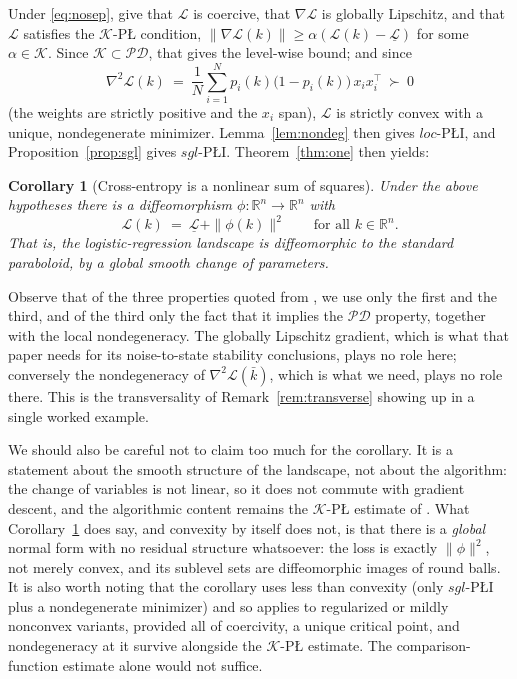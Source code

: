 \documentclass[11pt]{article}
\theoremstyle{plain}
\newtheorem{cor}[thm]{Corollary}
\theoremstyle{definition}
\theoremstyle{remark}
\newcommand{\R}{\mathbb{R}}
\begin{document}
Under \eqref{eq:nosep}, \cite{CuiJiangSontag2026} give that $\mathcal{L}$ is
coercive, that $\nabla\mathcal{L}$ is globally Lipschitz, and that $\mathcal{L}$
satisfies the $\mathcal{K}$-P\L{} condition,
$\|\nabla\mathcal{L}(k)\|\ge\alpha(\mathcal{L}(k)-\underline{\mathcal{L}})$ for
some $\alpha\in\mathcal{K}$. Since $\mathcal{K}\subset\mathcal{PD}$, that gives
the level-wise bound; and since
\[
  \nabla^2\mathcal{L}(k) \ =\ \frac1N\sum_{i=1}^N p_i(k)\bigl(1-p_i(k)\bigr)\,x_ix_i^\top
  \ \succ\ 0
\]
(the weights are strictly positive and the $x_i$ span), $\mathcal{L}$ is strictly
convex with a unique, nondegenerate minimizer. Lemma~\ref{lem:nondeg} then gives
$loc$-P\L{}I, and Proposition~\ref{prop:sgl} gives $sgl$-P\L{}I.
Theorem~\ref{thm:one} then yields:

\begin{cor}[Cross-entropy is a nonlinear sum of squares]\label{cor:logistic}
Under the above hypotheses there is a diffeomorphism $\phi\colon\R^n\to\R^n$ with
\[
  \mathcal{L}(k) \ =\ \underline{\mathcal{L}} + \|\phi(k)\|^2
  \qquad\text{for all } k\in\R^n .
\]
That is, the logistic-regression landscape is diffeomorphic to the standard
paraboloid, by a global smooth change of parameters.
\end{cor}

Observe that of the three properties quoted from \cite{CuiJiangSontag2026}, we use
only the first and the third, and of the third only the fact that it implies the
$\mathcal{PD}$ property, together with the local nondegeneracy. The globally Lipschitz gradient, which is
what that paper needs for its noise-to-state stability conclusions, plays no role
here; conversely the nondegeneracy of $\nabla^2\mathcal{L}(\bar k)$, which is what
we need, plays no role there. This is the transversality of
Remark~\ref{rem:transverse} showing up in a single worked example.

We should also be careful not to claim too much for the corollary. It is a statement about
the smooth structure of the landscape, not about the algorithm: the change of
variables is not linear, so it does not commute with gradient descent, and the
algorithmic content remains the $\mathcal{K}$-P\L{} estimate of
\cite{CuiJiangSontag2026}. What Corollary~\ref{cor:logistic} does say, and
convexity by itself does not, is that there is a \emph{global} normal form with no
residual structure whatsoever: the loss is exactly $\|\phi\|^2$, not merely
convex, and its sublevel sets are diffeomorphic images of round balls. It is also
worth noting that the corollary uses less than convexity (only $sgl$-P\L{}I plus
a nondegenerate minimizer) and so applies to regularized or mildly nonconvex
variants, provided all of coercivity, a unique critical point, and nondegeneracy
at it survive alongside the $\mathcal{K}$-P\L{} estimate. The comparison-function
estimate alone would not suffice.
\end{document}
